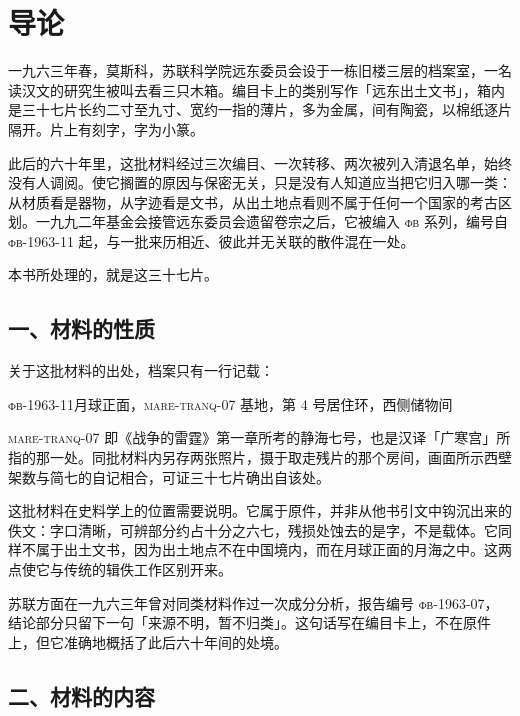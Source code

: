 \chapter*{导\quad 论}
{}

一九六三年春，莫斯科，苏联科学院远东委员会设于一栋旧楼三层的档案室，一名读汉文的研究生被叫去看三只木箱。编目卡上的类别写作「远东出土文书」，箱内是三十七片长约二寸至九寸、宽约一指的薄片，多为金属，间有陶瓷，以棉纸逐片隔开。片上有刻字，字为小篆。

此后的六十年里，这批材料经过三次编目、一次转移、两次被列入清退名单，始终没有人调阅。使它搁置的原因与保密无关，只是没有人知道应当把它归入哪一类：从材质看是器物，从字迹看是文书，从出土地点看则不属于任何一个国家的考古区划。一九九二年基金会接管远东委员会遗留卷宗之后，它被编入 \textsc{фв} 系列，编号自 \textsc{фв}-1963-11 起，与一批来历相近、彼此并无关联的散件混在一处。

本书所处理的，就是这三十七片。

\section*{一、材料的性质}

关于这批材料的出处，档案只有一行记载：

\begin{center}
\small
\textsc{фв}-1963-11\quad 月球正面，\textsc{mare-tranq-07} 基地，第 4 号居住环，西侧储物间
\end{center}

\textsc{mare-tranq-07} 即《战争的雷霆》第一章所考的静海七号，也是汉译「广寒宫」所指的那一处。同批材料内另存两张照片，摄于取走残片的那个房间，画面所示西壁架数与简七的自记相合，可证三十七片确出自该处。

这批材料在史料学上的位置需要说明。它属于原件，并非从他书引文中钩沉出来的佚文：字口清晰，可辨部分约占十分之六七，残损处蚀去的是字，不是载体。它同样不属于出土文书，因为出土地点不在中国境内，而在月球正面的月海之中。这两点使它与传统的辑佚工作区别开来。

苏联方面在一九六三年曾对同类材料作过一次成分分析，报告编号 \textsc{фв}-1963-07，结论部分只留下一句「来源不明，暂不归类」。这句话写在编目卡上，不在原件上，但它准确地概括了此后六十年间的处境。

\section*{二、材料的内容}

